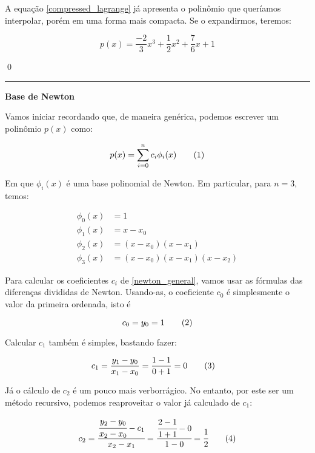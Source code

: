\documentclass[9.5pt,reqno,a4paper]{amsart}
\newcommand\numberthis{\addtocounter{equation}{1}\tag{\theequation}}
\begin{document}
\bigskip
\bigskip
A equação \eqref{compressed_lagrange} já apresenta o polinômio que queríamos interpolar, porém em uma forma mais compacta. Se o expandirmos, teremos:

\begin{equation}
    p(x) = \frac{-2}{3}x^3 + \frac{1}{2}x^2  + \frac{7}{6}x + 1
\end{equation}

\qed\null

\bigskip
\bigskip
\noindent\rule{\textwidth}{0.4pt}
\textbf{Base de Newton}

Vamos iniciar recordando que, de maneira genérica, podemos escrever um polinômio $p(x)$ como:

\begin{equation*}
    p(x) = \sum_{i=0}^{n} c_i\phi_i(x) \numberthis \label{newton_general}
\end{equation*}

\bigskip
\bigskip
Em que $\phi_i(x)$ é uma base polinomial de Newton. Em particular, para $n=3$, temos:

\begin{align*}
    \phi_0(x) &= 1\\
    \phi_1(x) &= x - x_0\\
    \phi_2(x) &= (x - x_0)(x - x_1)\\
    \phi_3(x) &= (x - x_0)(x - x_1)(x - x_2)
\end{align*}

\bigskip
\bigskip
Para calcular os coeficientes $c_i$ de \eqref{newton_general}, vamos usar as fórmulas das diferenças divididas de Newton. Usando-as, o coeficiente $c_0$ é simplesmente o valor da primeira ordenada, isto é

\begin{equation*}
    c_0 = y_0 = 1 \numberthis \label{c_0}
\end{equation*}

\bigskip
\bigskip
Calcular $c_1$ também é simples, bastando fazer:

\begin{align*}
    c_1 &= \frac{y_1 - y_0}{x_1 - x_0} = \frac{1 - 1}{0 + 1} = 0 \numberthis \label{c_1}
\end{align*}

\bigskip
\bigskip
Já o cálculo de $c_2$ é um pouco mais verborrágico. No entanto, por este ser um método recursivo, podemos reaproveitar o valor já calculado de $c_1$:

\begin{align*}
    c_2 = \cfrac{\cfrac{y_2 - y_0}{x_2 - x_0} - c_1}{x_2 - x_1}
        = \cfrac{\cfrac{2 - 1}{1 + 1} - 0}{1 - 0}
        = \cfrac{1}{2} \numberthis \label{c_2}
\end{align*}
\end{document}
